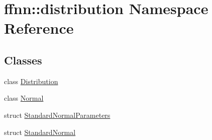 \hypertarget{namespaceffnn_1_1distribution}{\section{ffnn\-:\-:distribution Namespace Reference}
\label{namespaceffnn_1_1distribution}
}
\subsection*{Classes}
\begin{DoxyCompactItemize}
\item 
class \hyperlink{classffnn_1_1distribution_1_1_distribution}{Distribution}
\item 
class \hyperlink{classffnn_1_1distribution_1_1_normal}{Normal}
\item 
struct \hyperlink{structffnn_1_1distribution_1_1_standard_normal_parameters}{Standard\-Normal\-Parameters}
\item 
struct \hyperlink{structffnn_1_1distribution_1_1_standard_normal}{Standard\-Normal}
\end{DoxyCompactItemize}
